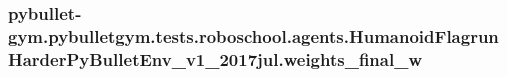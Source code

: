 \subsubsection[{\texorpdfstring{weights\+\_\+final\+\_\+w}{weights_final_w}}]{\setlength{\rightskip}{0pt plus 5cm}pybullet-\/gym.\+pybulletgym.\+tests.\+roboschool.\+agents.\+Humanoid\+Flagrun\+Harder\+Py\+Bullet\+Env\+\_\+v1\+\_\+2017jul.\+weights\+\_\+final\+\_\+w}\hypertarget{namespacepybullet-gym_1_1pybulletgym_1_1tests_1_1roboschool_1_1agents_1_1_humanoid_flagrun_harder_py_bullet_env__v1__2017jul_a580bfc05835a1124d0cf757b4eb21ae3}{}\label{namespacepybullet-gym_1_1pybulletgym_1_1tests_1_1roboschool_1_1agents_1_1_humanoid_flagrun_harder_py_bullet_env__v1__2017jul_a580bfc05835a1124d0cf757b4eb21ae3}
